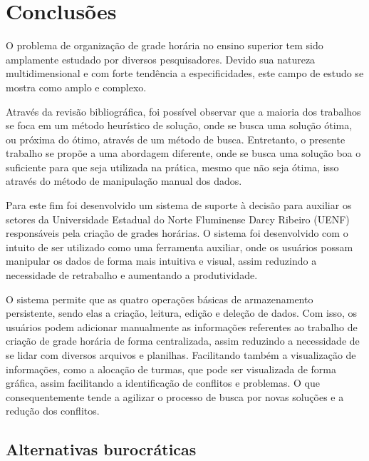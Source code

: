 \chapter{Conclusões} \label{chap:conclusoes}


O problema de organização de grade horária no ensino superior tem sido amplamente estudado por diversos pesquisadores. Devido sua natureza multidimensional e com forte tendência a especificidades, este campo de estudo se mostra como amplo e complexo.

Através da revisão bibliográfica, foi possível observar que a maioria dos trabalhos se foca em um método heurístico de solução, onde se busca uma solução ótima, ou próxima do ótimo, através de um método de busca. Entretanto, o presente trabalho se propõe a uma abordagem diferente, onde se busca uma solução boa o suficiente para que seja utilizada na prática, mesmo que não seja ótima, isso através do método de manipulação manual dos dados.

Para este fim foi desenvolvido um sistema de suporte à decisão para auxiliar os setores da Universidade Estadual do Norte Fluminense Darcy Ribeiro (UENF) responsáveis pela criação de grades horárias. O sistema foi desenvolvido com o intuito de ser utilizado como uma ferramenta auxiliar, onde os usuários possam manipular os dados de forma mais intuitiva e visual, assim reduzindo a necessidade de retrabalho e aumentando a produtividade.

O sistema permite que as quatro operações básicas de armazenamento persistente, sendo elas a criação, leitura, edição e deleção de dados. Com isso, os usuários podem adicionar manualmente as informações referentes ao trabalho de criação de grade horária de forma centralizada, assim reduzindo a necessidade de se lidar com diversos arquivos e planilhas. Facilitando também a visualização de informações, como a alocação de turmas, que pode ser visualizada de forma gráfica, assim facilitando a identificação de conflitos e problemas. O que consequentemente tende a agilizar o processo de busca por novas soluções e a redução dos conflitos.



\section{Alternativas burocráticas} %

